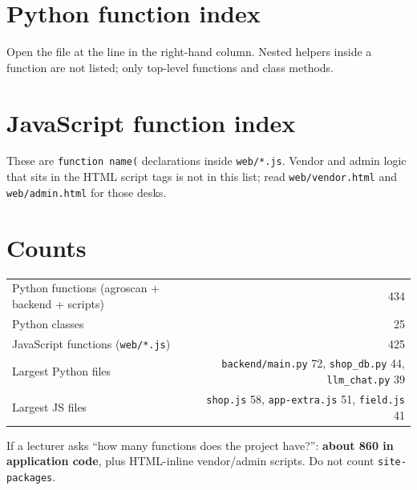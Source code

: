 \documentclass[Times,11pt,oneside,openany]{report}
\begin{document}
\chapter{Python function index}
Open the file at the line in the right-hand column. Nested helpers inside a function are not listed; only top-level functions and class methods.







\chapter{JavaScript function index}
These are \texttt{function name(} declarations inside \texttt{web/*.js}. Vendor and admin logic that sits in the HTML script tags is not in this list; read \texttt{web/vendor.html} and \texttt{web/admin.html} for those desks.



\chapter{Counts}
\begin{center}
\begin{tabular}{lr}
\toprule
Python functions (agroscan + backend + scripts) & 434 \\
Python classes & 25 \\
JavaScript functions (\texttt{web/*.js}) & 425 \\
Largest Python files & \texttt{backend/main.py} 72, \texttt{shop\_db.py} 44, \texttt{llm\_chat.py} 39 \\
Largest JS files & \texttt{shop.js} 58, \texttt{app-extra.js} 51, \texttt{field.js} 41 \\
\bottomrule
\end{tabular}
\end{center}

If a lecturer asks ``how many functions does the project have?'': \textbf{about 860 in application code}, plus HTML-inline vendor/admin scripts. Do not count \texttt{site-packages}.
\end{document}
